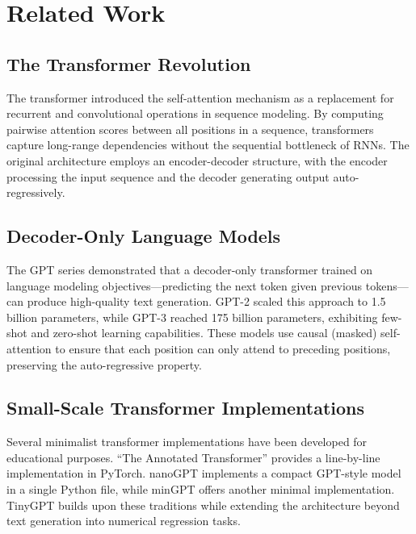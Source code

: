 \documentclass[conference]{IEEEtran}
\begin{document}
\section{Related Work}
\label{sec:related}

\subsection{The Transformer Revolution}

The transformer \cite{vaswani2017attention} introduced the self-attention mechanism as a replacement for recurrent and convolutional operations in sequence modeling. By computing pairwise attention scores between all positions in a sequence, transformers capture long-range dependencies without the sequential bottleneck of RNNs. The original architecture employs an encoder-decoder structure, with the encoder processing the input sequence and the decoder generating output auto-regressively.

\subsection{Decoder-Only Language Models}

The GPT series \cite{radford2018improving, brown2020language} demonstrated that a decoder-only transformer trained on language modeling objectives---predicting the next token given previous tokens---can produce high-quality text generation. GPT-2 \cite{radford2019language} scaled this approach to 1.5 billion parameters, while GPT-3 \cite{brown2020language} reached 175 billion parameters, exhibiting few-shot and zero-shot learning capabilities. These models use causal (masked) self-attention to ensure that each position can only attend to preceding positions, preserving the auto-regressive property.

\subsection{Small-Scale Transformer Implementations}

Several minimalist transformer implementations have been developed for educational purposes. ``The Annotated Transformer'' \cite{rush2018annotated} provides a line-by-line implementation in PyTorch. nanoGPT \cite{karpathy2023nanogpt} implements a compact GPT-style model in a single Python file, while minGPT \cite{karpathy2022mingpt} offers another minimal implementation. TinyGPT builds upon these traditions while extending the architecture beyond text generation into numerical regression tasks.
\end{document}

